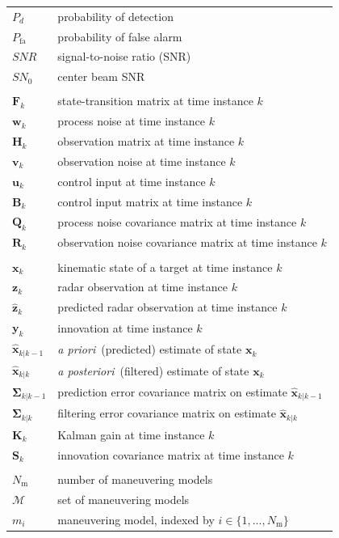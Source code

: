 \documentclass[english, 12pt, a4paper, elec, utf8, a-1b, online]{aaltothesis}
\renewcommand{\vec}[1]{\mathbf{#1}}
\newcommand{\xprior}{\hat{\vec{x}}_{k|k-1}}
\newcommand{\xpost}{\hat{\vec{x}}_{k|k}}
\newcommand{\priorecov}{\boldsymbol{\Sigma}_{k|k-1}}
\newcommand{\postecov}{\boldsymbol{\Sigma}_{k|k}}
\newcommand{\prefitinnov}{\vec{y}_k}
\newcommand{\x}{\vec{x}_k}
\newcommand{\z}{\vec{z}_k}
\newcommand{\stmodel}{\vec{F}_k}
\newcommand{\cimodel}{\vec{B}_k}
\newcommand{\cinput}{\vec{u}_k}
\newcommand{\pnoise}{\vec{w}_k}
\newcommand{\omodel}{\vec{H}_k}
\newcommand{\onoise}{\vec{v}_k}
\newcommand{\ocov}{\vec{R}_k}
\newcommand{\pcov}{\vec{Q}_k}
\newcommand{\innocov}{\vec{S}_k}
\newcommand{\gain}{\vec{K}_k}
\def\prior{\textit{a priori}\ }
\def\post{\textit{a posteriori}\ }
\newcommand{\zhat}{\hat{\vec{z}}_k}
\newcommand{\mimm}{\mathcal{M}}
\newcommand{\nmodels}{{N_\text{m}}}
\begin{document}
\begin{longtable}{ll}
$P_d$ & probability of detection \\
$P_\text{fa}$ & probability of false alarm \\
$SNR$ & signal-to-noise ratio (SNR) \\
$SN_0$ & center beam SNR \\
&\\
$\stmodel$ & state-transition matrix at time instance $k$\\
$\pnoise$ & process noise at time instance $k$\\
$\omodel$ & observation matrix at time instance $k$\\
$\onoise$ & observation noise at time instance $k$\\
$\cinput$ & control input at time instance $k$\\
$\cimodel$ & control input matrix at time instance $k$\\
$\pcov$ & process noise covariance matrix at time instance $k$\\
$\ocov$ & observation noise covariance matrix at time instance $k$\\
&\\
$\x$ & kinematic state of a target at time instance $k$ \\
$\z$ & radar observation at time instance $k$ \\
$\zhat$ & predicted radar observation at time instance $k$ \\
$\prefitinnov$ & innovation at time instance $k$ \\
$\xprior$ & \prior (predicted) estimate of state $\x$\\
$\xpost$ & \post (filtered) estimate of state $\x$ \\
$\priorecov$ & prediction error covariance matrix on estimate $\xprior$ \\
$\postecov$ & filtering error covariance matrix on estimate $\xpost$ \\
$\gain$ & Kalman gain at time instance $k$ \\
$\innocov$ & innovation covariance matrix at time instance $k$ \\
&\\
$\nmodels$ & number of maneuvering models \\
$\mimm$ & set of maneuvering models \\
$m_i$ & maneuvering model, indexed by $i \in \{1, ..., \nmodels\}$ \\

\end{longtable}
\end{document}
